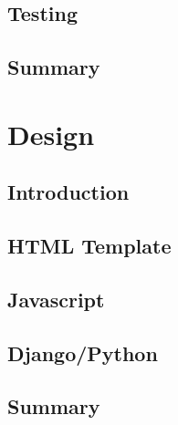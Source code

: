 \documentclass[a4paper,12pt,oneside]{book}
\begin{document}
	\section{Testing}
		
	\section{Summary}
		
		
\chapter{Design}
	\section{Introduction}
		
	\section{HTML Template}
		
	\section{Javascript}
		
	\section{Django/Python}
		
	\section{Summary}
		
		
		

		


\renewcommand{\bibname}{Bibliography}

\end{document}
